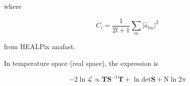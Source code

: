 \documentclass[a4paper, 11pt]{article}
\begin{document}
where 

\begin{equation}
\dot{C}_l=\frac{1}{2l+1}\sum_m \vert\hat{a}_{lm}\vert^2
\end{equation}

from HEALPix anafast. 


In temperature space (real space), the expression is

\begin{equation}
-2 \ln\mathcal{L}\propto\textbf{T}\textbf{S}^{-1}\textbf{T}+\ln\text{det}\textbf{S}+\text{N}\ln2\pi
\end{equation}
\end{document}
